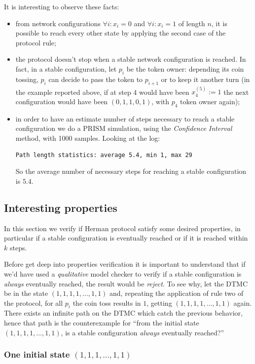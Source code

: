 It is interesting to observe these facts:
\begin{itemize}
\item from network configurations $\forall i:x_i=0$ and $\forall
  i:x_i=1$ of length $n$, it is possible to reach every other state by
  applying the second case of the protocol rule;
\item the protocol doesn't stop when a stable network configuration is
  reached. In fact, in a stable configuration, let $p_i$ be the token
  owner: depending its coin tossing, $p_i$ can decide to pass the
  token to $p_{i+1}$ or to keep it another turn (in the example
  reported above, if at step 4 would have been $x_4^{(5)}:= 1$ the
  next configuration would have been $(0, 1, 1, 0, 1)$, with $p_4$
  token owner again);
\item in order to have an estimate number of steps necessary to reach
  a stable configuration we do a PRISM simulation, using the
  \emph{Confidence Interval} method, with 1000 samples. Looking at the
  log:
\begin{verbatim}
Path length statistics: average 5.4, min 1, max 29
\end{verbatim}
  So the average number of necessary steps for reaching a stable
  configuration is $5.4$.
\end{itemize}

\subsection{Interesting properties}

In this section we verify if Herman protocol satisfy some desired
properties, in particular if a stable configuration is eventually
reached or if it is reached within $k$ steps.

Before get deep into properties verification it is important to
understand that if we'd have used a \emph{qualitative} model checker
to verify if a stable configuration is \emph{always} eventually
reached, the result would be \emph{reject}. To see why, let the DTMC
be in the state $(1,1,1,1,\ldots,1,1)$ and, repeating the application
of rule two of the protocol, for all $p_i$ the coin toss results in
$1$, getting $(1,1,1,1,\ldots,1,1)$ again. There exists an infinite
path on the DTMC which catch the previous behavior, hence that path is
the counterexample for ``from the initial state
$(1,1,1,1,\ldots,1,1)$, is a stable configuration \emph{always}
eventually reached?''

\subsubsection{One initial state $(1,1,1,\ldots,1,1)$}

